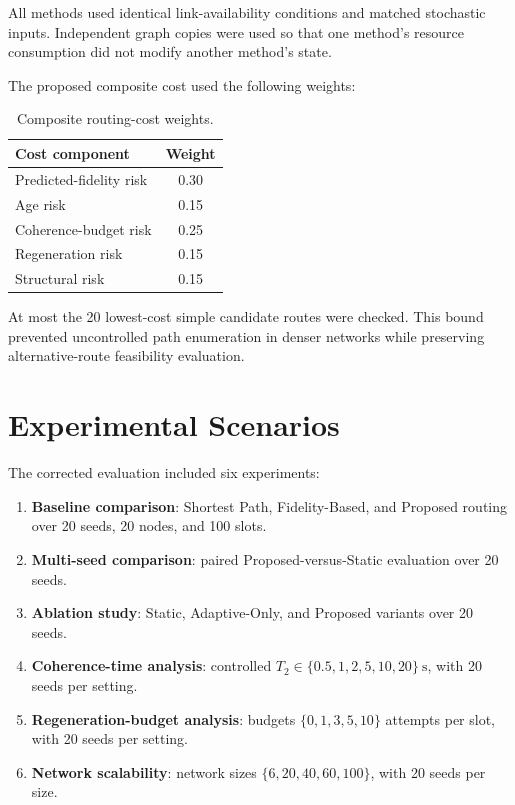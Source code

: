 All methods used identical link-availability conditions and matched stochastic
inputs. Independent graph copies were used so that one method's resource
consumption did not modify another method's state.

The proposed composite cost used the following weights:

\begin{table}[htbp]
\centering
\caption{Composite routing-cost weights.}
\label{tab:routing_weights}
\begin{tabular}{lc}
\hline
Cost component & Weight \\
\hline
Predicted-fidelity risk & 0.30 \\
Age risk & 0.15 \\
Coherence-budget risk & 0.25 \\
Regeneration risk & 0.15 \\
Structural risk & 0.15 \\
\hline
\end{tabular}
\end{table}

At most the 20 lowest-cost simple candidate routes were checked. This bound
prevented uncontrolled path enumeration in denser networks while preserving
alternative-route feasibility evaluation.

\section{Experimental Scenarios}

The corrected evaluation included six experiments:

\begin{enumerate}
    \item \textbf{Baseline comparison}: Shortest Path, Fidelity-Based, and
    Proposed routing over 20 seeds, 20 nodes, and 100 slots.
    \item \textbf{Multi-seed comparison}: paired Proposed-versus-Static
    evaluation over 20 seeds.
    \item \textbf{Ablation study}: Static, Adaptive-Only, and Proposed variants
    over 20 seeds.
    \item \textbf{Coherence-time analysis}: controlled
    \(T_2\in\{0.5,1,2,5,10,20\}~\mathrm{s}\), with 20 seeds per setting.
    \item \textbf{Regeneration-budget analysis}: budgets
    \(\{0,1,3,5,10\}\) attempts per slot, with 20 seeds per setting.
    \item \textbf{Network scalability}: network sizes
    \(\{6,20,40,60,100\}\), with 20 seeds per size.
\end{enumerate}

